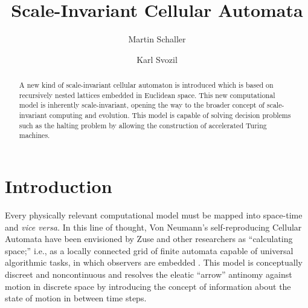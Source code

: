 \documentclass[pre,amssymb,showpacs,showkeys,preprint]{revtex4}
\begin{document}



\title{Scale-Invariant Cellular Automata}

\author{Martin Schaller}

\author{Karl Svozil}




\begin{abstract}
A new kind of scale-invariant cellular automaton is introduced which is based on recursively nested
lattices embedded in Euclidean space.
This new computational model is inherently scale-invariant, opening the way to the broader concept
of scale-invariant computing and evolution.
This model is capable of solving decision problems such as the
halting problem by allowing the construction of accelerated Turing machines.
\end{abstract}




\maketitle

\section{Introduction}

Every physically relevant computational model must be mapped into space-time and {\it vice versa.}
In this line of thought, Von Neumann's self-reproducing Cellular Automata \cite{v-neumann-66}
have been envisioned by Zuse \cite{zuse-67,zuse-69,zuse-94,zuse-70}
and other researchers  \cite{fredkin,toffoli-margolus-90,wolfram-2002}
as  ``calculating space;''
i.e., as a
locally connected grid of finite automata \cite{hopcroft}
capable of universal algorithmic tasks, in which
observers are embedded \cite{toffoli:79}.
This model is conceptually discreet and
noncontinuous and resolves the eleatic ``arrow''
antinomy \cite{zeno,ki-57,gruenbaum:68,sv-aut-rev}
against motion in discrete space by introducing
the concept of information about the state of motion in between time steps.
\end{document}
